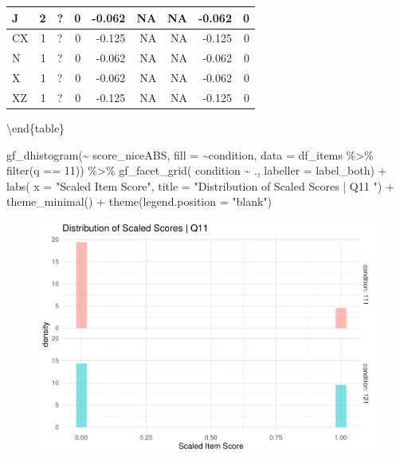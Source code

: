 \documentclass[
  letterpaper,
  DIV=11,
  numbers=noendperiod]{scrreprt}
\newenvironment{Shaded}{\begin{snugshade}}{\end{snugshade}}
\newcommand{\AttributeTok}[1]{\textcolor[rgb]{0.40,0.45,0.13}{#1}}
\newcommand{\DecValTok}[1]{\textcolor[rgb]{0.68,0.00,0.00}{#1}}
\newcommand{\FunctionTok}[1]{\textcolor[rgb]{0.28,0.35,0.67}{#1}}
\newcommand{\NormalTok}[1]{\textcolor[rgb]{0.00,0.23,0.31}{#1}}
\newcommand{\SpecialCharTok}[1]{\textcolor[rgb]{0.37,0.37,0.37}{#1}}
\newcommand{\StringTok}[1]{\textcolor[rgb]{0.13,0.47,0.30}{#1}}
\begin{document}
\begin{tabular}[t]{l|r|l|r|r|r|r|r|r}
\hline
\hspace{1em}J & 2 & ? & 0 & -0.062 & NA & NA & -0.062 & 0\\
\hline
\hspace{1em}CX & 1 & ? & 0 & -0.125 & NA & NA & -0.125 & 0\\
\hline
\hspace{1em}N & 1 & ? & 0 & -0.062 & NA & NA & -0.062 & 0\\
\hline
\hspace{1em}X & 1 & ? & 0 & -0.062 & NA & NA & -0.062 & 0\\
\hline
\hspace{1em}XZ & 1 & ? & 0 & -0.125 & NA & NA & -0.125 & 0\\
\hline
\end{tabular}

\textbackslash end\{table\}

\begin{Shaded}
\begin{Highlighting}[]
\FunctionTok{gf\_dhistogram}\NormalTok{(}\SpecialCharTok{\textasciitilde{}}\NormalTok{ score\_niceABS, }\AttributeTok{fill =} \SpecialCharTok{\textasciitilde{}}\NormalTok{condition, }\AttributeTok{data =}\NormalTok{ df\_items }\SpecialCharTok{\%\textgreater{}\%} \FunctionTok{filter}\NormalTok{(q }\SpecialCharTok{==} \DecValTok{11}\NormalTok{)) }\SpecialCharTok{\%\textgreater{}\%} 
  \FunctionTok{gf\_facet\_grid}\NormalTok{( condition }\SpecialCharTok{\textasciitilde{}}\NormalTok{ ., }\AttributeTok{labeller =}\NormalTok{ label\_both) }\SpecialCharTok{+} 
  \FunctionTok{labs}\NormalTok{( }\AttributeTok{x =} \StringTok{"Scaled Item Score"}\NormalTok{, }\AttributeTok{title =} \StringTok{"Distribution of Scaled Scores | Q11 "}\NormalTok{) }\SpecialCharTok{+} 
  \FunctionTok{theme\_minimal}\NormalTok{() }\SpecialCharTok{+} \FunctionTok{theme}\NormalTok{(}\AttributeTok{legend.position =} \StringTok{"blank"}\NormalTok{)}
\end{Highlighting}
\end{Shaded}

\begin{figure}[H]

{\centering \includegraphics{analysis/SGC3A/2_sgc3A_scoring_files/figure-pdf/Q11-distribution-1.pdf}

}

\end{figure}
\end{document}
